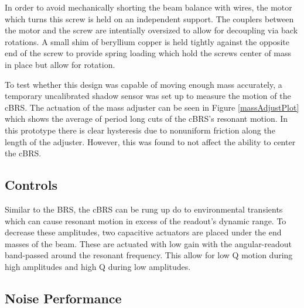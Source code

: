 \documentclass [12pt, proquest]{uwthesis}[2019]
\begin{document}
In order to avoid mechanically shorting the beam balance with wires, the motor which turns this screw is held on an independent support. The couplers between the motor and the screw are intentially oversized to allow for decoupling via back rotations. A small shim of beryllium copper is held tightly against the opposite end of the screw to provide spring loading which hold the screws center of mass in place but allow for rotation.

To test whether this design was capable of moving enough mass accurately, a temporary uncalibrated shadow sensor was set up to measure the motion of the cBRS. The actuation of the mass adjuster can be seen in Figure \ref{massAdjustPlot} which shows the average of period long cuts of the cBRS's resonant motion. In this prototype there is clear hysteresis due to nonuniform friction along the length of the adjuster. However, this was found to not affect the ability to center the cBRS. 

\subsection{Controls}

Similar to the BRS, the cBRS can be rung up do to environmental transients which can cause resonant motion in excess of the readout's dynamic range. To decrease these amplitudes, two capacitive actuators are placed under the end masses of the beam. These are actuated with low gain with the angular-readout band-passed around the resonant frequency. This allow for low Q motion during high amplitudes and high Q during low amplitudes.

\subsection{Noise Performance}
\end{document}
